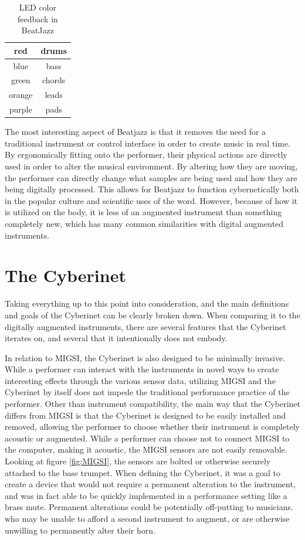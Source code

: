\begin{table}[]
    \centering
    \begin{tabular}{|c||c|}
    \hline
      red   & drums \\
      \hline
      blue   &  bass\\
      \hline
      green & chords \\
      \hline
      orange & leads\\
      \hline
      purple & pads\\
      \hline
    \end{tabular}
    \caption{LED color feedback in BeatJazz}
    \label{tab:bjLEDs}
\end{table}


The most interesting aspect of Beatjazz is that it removes the need for a traditional instrument or control interface in order to create music in real time. By ergonomically fitting onto the performer, their physical actions are directly used in order to alter the musical environment. By altering how they are moving, the performer can directly change what samples are being used and how they are being digitally processed. This allows for Beatjazz to function cybernetically both in the popular culture and scientific uses of the word. However, because of how it is utilized on the body, it is less of an augmented instrument than something completely new, which has many common similarities with digital augmented instruments.

\section{The Cyberinet}
Taking everything up to this point into consideration, and the main definitions and goals of the Cyberinet can be clearly broken down. When comparing it to the digitally augmented instruments, there are several features that the Cyberinet iterates on, and several that it intentionally does not embody.

In relation to MIGSI, the Cyberinet is also designed to be minimally invasive. While a performer can interact with the instruments in novel ways to create interesting effects through the various sensor data, utilizing MIGSI and the Cyberinet by itself does not impede the traditional performance practice of the performer. Other than instrument compatibility, the main way that the Cyberinet differs from MIGSI is that the Cyberinet is designed to be easily installed and removed, allowing the performer to choose whether their instrument is completely acoustic or augmented. While a performer can choose not to connect MIGSI to the computer, making it acoustic, the MIGSI sensors are not easily removable. Looking at figure \ref{fig:MIGSI}, the sensors are bolted or otherwise securely attached to the base trumpet. When defining the Cyberinet, it was a goal to create a device that would not require a permanent alteration to the instrument, and was in fact able to be quickly implemented in a performance setting like a brass mute. Permanent alterations could be potentially off-putting to musicians. who may be unable to afford a second instrument to augment, or are otherwise unwilling to permanently alter their horn.

